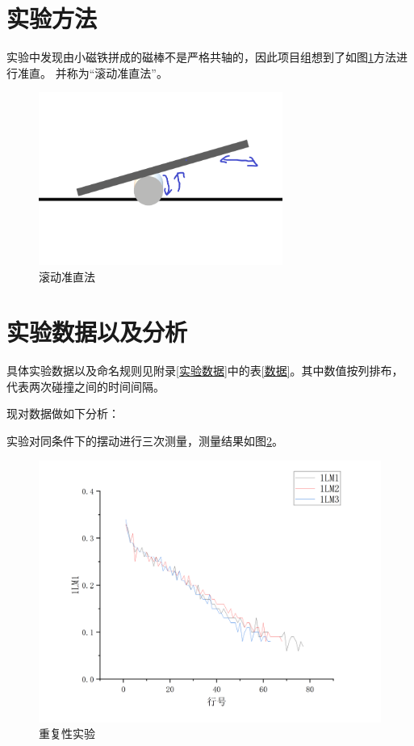 \documentclass[AutoFakeBold]{LZUThesis}
\begin{document}
\section{实验方法}
实验中发现由小磁铁拼成的磁棒不是严格共轴的，因此项目组想到了如图\ref{a_way}方法进行准直。
并称为“滚动准直法”。
\begin{figure}[H]
    \centering
    \includegraphics[width=8cm]{figures/a_way.png}
    \caption{滚动准直法}
    \label{a_way}
\end{figure}

\section{实验数据以及分析}
具体实验数据以及命名规则见附录\ref{实验数据}中的表\ref{数据}。其中数值按列排布，代表两次碰撞之间的时间间隔。

现对数据做如下分析：

实验对同条件下的摆动进行三次测量，测量结果如图\ref{re}。
\begin{figure}[H]
    \centering
    \includegraphics[width=12cm]{figures/重复性.png}
    \caption{重复性实验}
    \label{re}
\end{figure}
\end{document}
